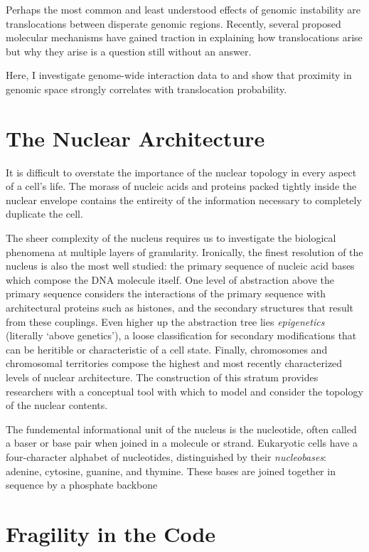 \documentclass[phd,tocprelim]{cornell}
\begin{document}
Perhaps the most common and least understood effects of genomic instability are
translocations between disperate genomic regions.  Recently, several proposed
molecular mechanisms have gained traction in explaining how translocations arise
but why they arise is a question still without an answer.

Here, I investigate genome-wide interaction data to and show that proximity in
genomic space strongly correlates with translocation probability.

\chapter{The Nuclear Architecture}

It is difficult to overstate the importance of the nuclear topology in 
every aspect of a cell's life.  The morass of nucleic acids and proteins
packed tightly inside the nuclear envelope contains the entireity of the
information necessary to completely duplicate the cell.

The sheer complexity of the nucleus requires us to investigate the biological
phenomena at multiple layers of granularity.  Ironically, the finest resolution
of the nucleus is also the most well studied: the primary sequence of nucleic
acid bases which compose the DNA molecule itself.  One level of abstraction 
above the primary sequence considers the interactions of the primary sequence
with architectural proteins such as histones, and the secondary structures that
result from these couplings.  Even higher up the abstraction tree lies
\textit{epigenetics} (literally `above genetics'\cite{dictepi2014}), a loose
classification for secondary modifications that can be heritible or characteristic
of a cell state.  Finally, chromosomes and chromosomal territories compose the
highest and most recently characterized levels of nuclear architecture.  The
construction of this stratum provides researchers with a conceptual tool with
which to model and consider the topology of the nuclear contents.

The fundemental informational unit of the nucleus is the nucleotide, often
called a baser or base pair when joined in a molecule or strand.  Eukaryotic
cells have a four-character alphabet of nucleotides, distinguished by their
\textit{nucleobases}: adenine, cytosine, guanine, and thymine.  These bases 
are joined together in sequence by a phosphate backbone




\chapter{Fragility in the Code}
\end{document}
